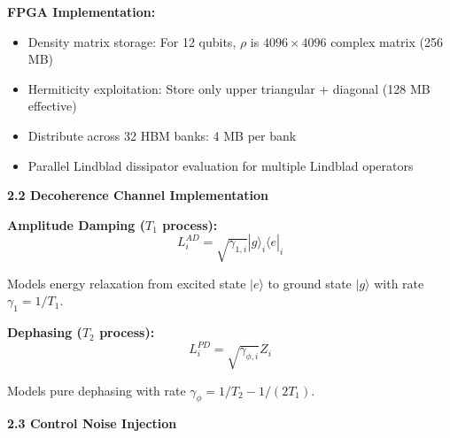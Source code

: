 \documentclass[12pt,a4paper]{article}
\begin{document}
\textbf{FPGA Implementation:}
\begin{itemize}[noitemsep]
\item Density matrix storage: For 12 qubits, $\rho$ is $4096 \times 4096$ complex matrix (256 MB)
\item Hermiticity exploitation: Store only upper triangular + diagonal (128 MB effective)
\item Distribute across 32 HBM banks: 4 MB per bank
\item Parallel Lindblad dissipator evaluation for multiple Lindblad operators
\end{itemize}

\textbf{2.2 Decoherence Channel Implementation}

\textbf{Amplitude Damping ($T_1$ process):}
\begin{equation}
L_i^{AD} = \sqrt{\gamma_{1,i}} |g\rangle_i \langle e|_i
\end{equation}

Models energy relaxation from excited state $|e\rangle$ to ground state $|g\rangle$ with rate $\gamma_1 = 1/T_1$.

\textbf{Dephasing ($T_2$ process):}
\begin{equation}
L_i^{PD} = \sqrt{\gamma_{\phi,i}} Z_i
\end{equation}

Models pure dephasing with rate $\gamma_\phi = 1/T_2 - 1/(2T_1)$.

\textbf{2.3 Control Noise Injection}
\end{document}
